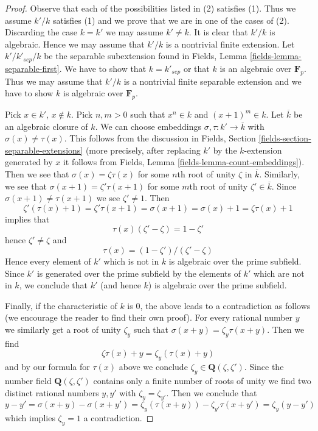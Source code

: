 \documentclass[10pt,a4paper]{amsart}
\theoremstyle{plain}
\theoremstyle{definition}
\theoremstyle{remark}
\numberwithin{equation}{subsection}
\begin{document}
\begin{proof}
Observe that each of the possibilities listed in (2) satisfies (1).
Thus we assume $k'/k$ satisfies (1) and we prove that we are in
one of the cases of (2). Discarding the case $k = k'$ we may assume
$k' \not = k$. It is clear that $k'/k$ is algebraic.
Hence we may assume that $k'/k$ is a nontrivial finite extension.
Let $k'/k'_{sep}/k$ be the separable subextension
found in Fields, Lemma \ref{fields-lemma-separable-first}.
We have to show that $k = k'_{sep}$ or that $k$ is an algebraic over
$\mathbf{F}_p$. Thus we may assume that $k'/k$
is a nontrivial finite separable extension and we have to show
$k$ is algebraic over $\mathbf{F}_p$.

\medskip\noindent
Pick $x \in k'$, $x \not \in k$. Pick $n, m > 0$ such that
$x^n \in k$ and $(x + 1)^m \in k$. Let $\overline{k}$ be an
algebraic closure of $k$. We can choose embeddings
$\sigma, \tau : k' \to \overline{k}$ with $\sigma(x) \not = \tau(x)$.
This follows from the discussion in
Fields, Section \ref{fields-section-separable-extensions}
(more precisely, after replacing $k'$ by the $k$-extension
generated by $x$ it follows from
Fields, Lemma \ref{fields-lemma-count-embeddings}).
Then we see that $\sigma(x) = \zeta \tau(x)$ for some
$n$th root of unity $\zeta$ in $\overline{k}$.
Similarly, we see that $\sigma(x + 1) = \zeta' \tau(x + 1)$
for some $m$th root of unity $\zeta' \in \overline{k}$.
Since $\sigma(x + 1) \not = \tau(x + 1)$ we see $\zeta' \not = 1$.
Then
$$
\zeta' (\tau(x) + 1) =
\zeta' \tau(x + 1) =
\sigma(x + 1) =
\sigma(x) + 1 =
\zeta \tau(x) + 1
$$
implies that
$$
\tau(x) (\zeta' - \zeta) = 1 - \zeta'
$$
hence $\zeta' \not = \zeta$ and
$$
\tau(x) = (1 - \zeta')/(\zeta' - \zeta)
$$
Hence every element of $k'$ which is not in $k$ is algebraic over the prime
subfield. Since $k'$ is generated over the prime subfield by the elements
of $k'$ which are not in $k$, we conclude that $k'$ (and hence $k$)
is algebraic over the prime subfield.

\medskip\noindent
Finally, if the characteristic of $k$ is $0$, the above leads to a
contradiction as follows (we encourage the reader to find their own proof).
For every rational number $y$ we similarly get a root of unity
$\zeta_y$ such that $\sigma(x + y) = \zeta_y\tau(x + y)$.
Then we find
$$
\zeta \tau(x) + y = \zeta_y(\tau(x) + y)
$$
and by our formula for $\tau(x)$ above we conclude
$\zeta_y \in \mathbf{Q}(\zeta, \zeta')$. Since the number field
$\mathbf{Q}(\zeta, \zeta')$ contains only a finite number of roots of
unity we find two distinct rational numbers $y, y'$ with
$\zeta_y = \zeta_{y'}$. Then we conclude that
$$
y - y' =
\sigma(x + y) - \sigma(x + y') =
\zeta_y(\tau(x + y)) - \zeta_{y'}\tau(x + y') = \zeta_y(y - y')
$$
which implies $\zeta_y = 1$ a contradiction.
\end{proof}
\end{document}
